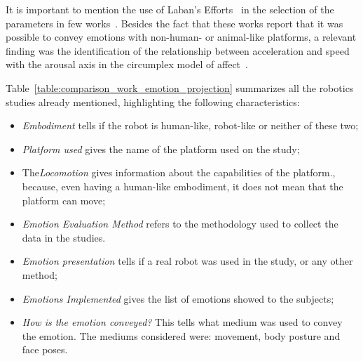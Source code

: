 It is important to mention the use of Laban’s Efforts~\cite{Laban1968} in the selection of the parameters in few works~\cite{BarakovaL10, Sharma2013}. Besides the fact that these works report that it was possible to convey emotions with non-human- or animal-like platforms, a relevant finding was the identification of the relationship between acceleration and speed with the arousal axis in the circumplex model of affect~\cite{Petta2010}.

Table~\ref{table:comparison_work_emotion_projection} summarizes all the robotics studies already mentioned, highlighting the following characteristics:
\begin{itemize}

	\item \textit{Embodiment} tells if the robot is human-like, robot-like or neither of these two;

	\item \textit{Platform used} gives the name of the platform used on the study;

	\item The\textit{Locomotion} gives information about the capabilities of the platform., because, even having a human-like embodiment, it does not mean that the platform can move;

	\item \textit{Emotion Evaluation Method} refers to the methodology used to collect the data in the studies.

	\item \textit{Emotion presentation} tells if a real robot was used in the study, or any other method;

	\item \textit{Emotions Implemented} gives the list of emotions showed to the subjects;
	
	\item \textit{How is the emotion conveyed?} This tells what medium was used to convey the emotion. The mediums considered were: movement, body posture and face poses.
	
\end{itemize}



